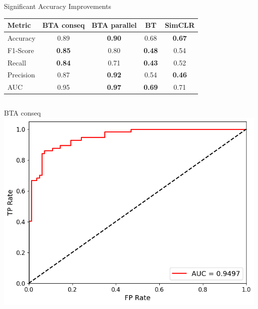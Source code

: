 \documentclass{beamer}
\begin{document}

\begin{frame}{Significant Accuracy Improvements}
\vspace{3mm}
\centering
\begin{tabular}{lcccc}
\hline
Metric & BTA conseq & BTA parallel & BT & SimCLR \\ \hline
Accuracy & 0.89 & \textbf{\color{red}0.90} & 0.68 & \textbf{0.67} \\
F1-Score & \textbf{\color{red}0.85} & 0.80 & \textbf{0.48} & 0.54 \\
Recall & \textbf{\color{red}0.84} & 0.71 & \textbf{0.43} & 0.52 \\
Precision & 0.87 & \textbf{\color{red}0.92} & 0.54 & \textbf{0.46} \\
AUC & 0.95 & \textbf{\color{red}0.97} & \textbf{0.69} & 0.71 \\ \hline
\end{tabular}

\vspace{6mm}
\begin{columns}[T]
    \centering
    {\tiny BTA conseq} \\
    \includegraphics[width=1\textwidth]{fig/roc-auc-BTA.png} \\

    \hspace{-8mm}
    

\end{columns}
\end{frame}
\end{document}
